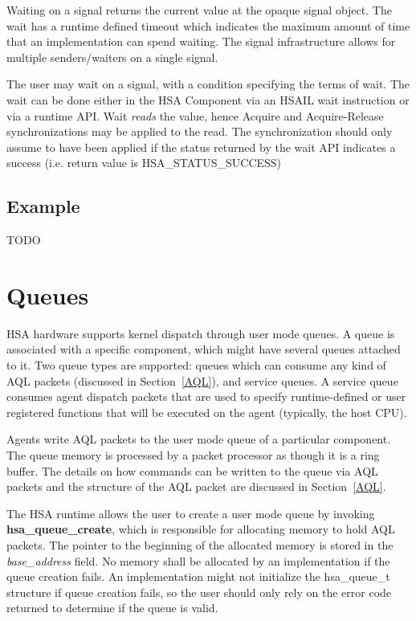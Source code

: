 \documentclass[draft]{book}
\newcommand{\reffun}[1]{\textbf{#1}}
\newcommand{\reffld}[1]{\textit{#1}}
\newcommand{\reftyp}[1]{#1}
\newcommand{\refenu}[1]{\reftyp{#1}}
\begin{document}
Waiting on a signal returns the current value at the opaque signal object. The
wait has a runtime defined timeout which indicates the maximum amount of time
that an implementation can spend waiting. The signal infrastructure allows for
multiple senders/waiters on a single signal.

The user may wait on a signal, with a condition specifying the terms of
wait. The wait can be done either in the HSA Component via an HSAIL wait
instruction or via a runtime API. Wait \emph{reads} the value, hence Acquire and
Acquire-Release synchronizations may be applied to the read. The synchronization
should only assume to have been applied if the status returned by the wait API
indicates a success (i.e. return value is \refenu{HSA_STATUS_SUCCESS})

\hypertarget{signal-example}{} \subsection{Example}
TODO

\hypertarget{architected-queue}{} \section{Queues} \label{architected-queue}
HSA hardware supports kernel dispatch through user mode queues. A queue is
associated with a specific component, which might have several queues attached
to it. Two queue types are supported: queues which can consume any kind of AQL
packets (discussed in Section~\ref{AQL}), and service queues. A service queue
consumes agent dispatch packets that are used to specify runtime-defined or user
registered functions that will be executed on the agent (typically, the host
CPU).

Agents write AQL packets to the user mode queue of a particular component. The
queue memory is processed by a packet processor as though it is a ring
buffer. The details on how commands can be written to the queue via AQL packets
and the structure of the AQL packet are discussed in Section~\ref{AQL}.

The HSA runtime allows the user to create a user mode queue by invoking
\reffun{hsa_queue_create}, which is responsible for allocating memory to hold
AQL packets. The pointer to the beginning of the allocated memory is stored in
the \reffld{base_address} field. No memory shall be allocated by an
implementation if the queue creation fails. An implementation might not
initialize the \reftyp{hsa_queue_t} structure if queue creation fails, so the
user should only rely on the error code returned to determine if the queue is
valid.
\end{document}
